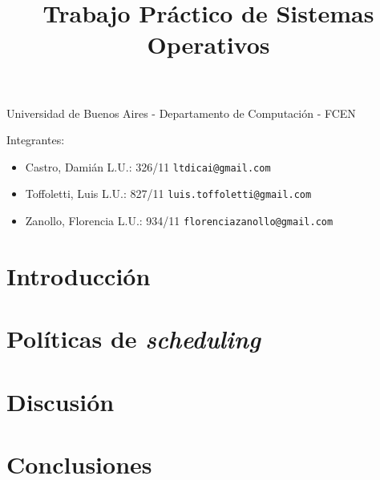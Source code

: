 \documentclass[a4paper,11pt]{article}
\title{Trabajo Práctico de Sistemas Operativos}
\begin{document}
\maketitle

\begin{center}
	Universidad de Buenos Aires - Departamento de Computaci\'on - FCEN
\end{center}

\vspace{2cm}
Integrantes:

\begin{itemize}
	\item Castro, Dami\'an L.U.: 326/11  \verb+ltdicai@gmail.com+
	\item Toffoletti, Luis L.U.: 827/11 \verb+luis.toffoletti@gmail.com+
	\item Zanollo, Florencia L.U.: 934/11 \verb+florenciazanollo@gmail.com+
\end{itemize}

\newpage

\tableofcontents

\newpage

\section{Introducción}



\section{Pol\'iticas de \emph{scheduling}}





\section{Discusi\'on}

\section{Conclusiones}
\end{document}

